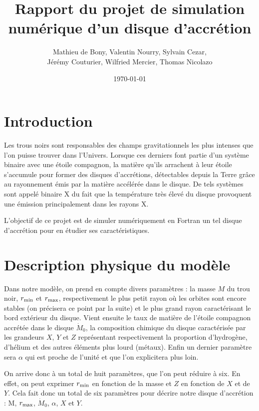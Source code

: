 \documentclass[a4paper,12pt]{article}
\title{Rapport du projet de simulation numérique d'un disque d'accrétion}
\author{Mathieu de Bony, Valentin Nourry, Sylvain Cezar,\\Jérémy Couturier, Wilfried Mercier, Thomas Nicolazo}
\date{\today}
\begin{document}
\maketitle

\renewcommand{\contentsname}{Sommaire}

\newpage

\tableofcontents

\newpage

\section{Introduction}



Les trous noirs sont responsables des champs gravitationnels les plus intenses que l'on puisse trouver dans l'Univers. Lorsque ces derniers font partie d'un système binaire avec une étoile compagnon, la matière qu'ils arrachent à leur étoile s'accumule pour former des disques d'accrétions, détectables depuis la Terre grâce au rayonnement émis par la matière accélérée dans le disque. De tels systèmes sont appelé binaire X du fait que la température très élevé du disque provoquent une émission principalement dans les rayons X.

L’objectif de ce projet est de simuler numériquement en Fortran un tel disque d'accrétion pour en étudier ses caractéristiques.

\section{Description physique du modèle}

Dans notre modèle, on prend en compte divers paramètres : la masse $M$ du trou noir, $r_{\rm{min}}$ et $r_{\rm{max}}$, respectivement le plus petit rayon où les orbites sont encore stables (on précisera ce point par la suite) et le plus grand rayon caractérisant le bord extérieur du disque. Vient ensuite le taux de matière de l'étoile compagnon accrétée dans le disque $\dot M_0$, la composition chimique du disque caractérisée par les grandeurs $X$, $Y$ et $Z$ représentant respectivement la proportion d'hydrogène, d’hélium et des autres éléments plus lourd (métaux). Enfin un dernier paramètre sera $\alpha $ qui est proche de l'unité et que l'on explicitera plus loin.

On arrive donc à un total de huit paramètres, que l'on peut réduire à six. En effet, on peut exprimer $r_{\rm{min}}$ en fonction de la masse et $Z$ en fonction de $X$ et de $Y$. Cela fait donc un total de six paramètres pour décrire notre disque d'accrétion : M, $r_{\rm{max}}$, $\dot M_0$, $\alpha$, $X$ et $Y$. \\
\end{document}
